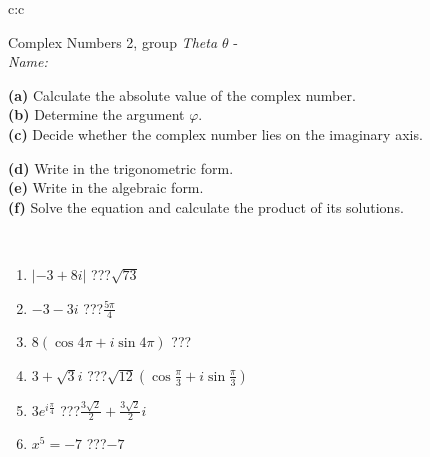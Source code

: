 \documentclass[10pt]{report}
\begin{document}
\newpage
\thispagestyle{empty}
\begin{tabular}{c:c}
\begin{minipage}[c][104.5mm][t]{0.5\linewidth}
\begin{center}
\vspace{5mm}
{\huge Complex Numbers 2, group \textit{Theta $\theta$} -}\\[5mm]
\textit{Name:}\phantom{xxxxxxxxxxxxxxxxxxxxxxxxxxxxxxxxxxxxxxxxxxxxxxxxxxxxxxxxxxxxxxxxx}\\[5mm]
\begin{minipage}{0.95\linewidth}
\begin{center}
{\small \begin{minipage}{0.44\textwidth} \raggedright
\textbf{(a)} Calculate the absolute value of the complex number. \\[1mm]
\textbf{(b)} Determine the argument \(\varphi\). \\[1mm]
\textbf{(c)} Decide whether the complex number lies on the imaginary axis. \end{minipage} \begin{minipage}{0.54\textwidth}
\textbf{(d)} Write in the trigonometric form. \\[1mm]
\textbf{(e)} Write in the algebraic form. \\[1mm]
\textbf{(f)} Solve the equation and calculate the product of its solutions.
\end{minipage}
}
\end{center}
\end{minipage}
\\[1mm]
\begin{minipage}{0.79\linewidth}
\begin{center}
\begin{varwidth}{\linewidth}
\setlength{\itemsep}{0pt}
\begin{enumerate}
\large
\item $|-3+8i|$\quad \dotfill\; ???\;\dotfill \quad $\sqrt{73}$
\item $-3-3i$\quad \dotfill\; ???\;\dotfill \quad $\frac{5\pi}{4}$
\item $8\left(\cos{4\pi}+i\sin{4\pi}\right)$\quad \dotfill\; ???\;\dotfill \quad {}
\item $3+\sqrt{3}i$\quad \dotfill\; ???\;\dotfill \quad $\sqrt{12}\left(\cos{\frac{\pi}{3}}+i\sin{\frac{\pi}{3}}\right)$
\item $3e^{i\frac{\pi}{4}}$\quad \dotfill\; ???\;\dotfill \quad $\frac{3\sqrt{2}}{2}+\frac{3\sqrt{2}}{2}i$
\item $x^5=-7$\quad \dotfill\; ???\;\dotfill \quad $-7$

\end{enumerate}
\end{varwidth}
\end{center}
\end{minipage}
\end{center}
\end{minipage}
\end{tabular}
\end{document}
